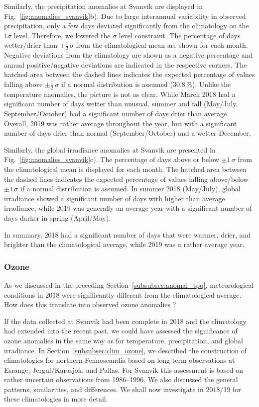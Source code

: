 \documentclass[bg, manuscript]{copernicus}
\begin{document}
Similarly, the precipitation anomalies at Svanvik are displayed in Fig.~\ref{fig:anomalies_svanvik}b). Due to large interannual variability in observed precipitation, only a few days deviated significantly from the climatology on the $1 \sigma$ level. Therefore, we lowered the $\sigma$ level constraint. The percentage of days wetter/drier than $\pm \frac{1}{2}\,\sigma$ from the climatological mean are shown for each month. Negative deviations from the climatology are shown as a negative percentage and annual positive/negative deviations are indicated in the respective corners. The hatched area between the dashed lines indicates the expected percentage of values falling above $\pm\frac{1}{2}\,\sigma$ if a normal distribution is assumed ($30.8\,\unit{\%}$). Unlike the temperature anomalies, the picture is not as clear. While March 2018 had a significant number of days wetter than unusual, summer and fall (May/July, September/October) had a significant number of days drier than average. Overall, 2019 was rather average throughout the year, but with a significant number of days drier than normal (September/October) and a wetter December.

Similarly, the global irradiance anomalies at Svanvik are presented in Fig.~\ref{fig:anomalies_svanvik}c). The percentage of days above or below $\pm 1\,\sigma$ from the climatological mean is displayed for each month. The hatched area between the dashed lines indicates the expected percentage of values falling above/below $\pm 1\,\sigma$ if a normal distribution is assumed. In summer 2018 (May/July), global irradiance showed a significant number of days with higher than average irradiance, while 2019 was generally an average year with a significant number of days darker in spring (April/May).

In summary, 2018 had a significant number of days that were warmer, drier, and brighter than the climatological average, while 2019 was a rather average year.

\subsubsection{Ozone}
\label{subsubsec:anomal_ozone}
As we discussed in the preceding Section~\ref{subsubsec:anomal_tpq}, meteorological conditions in 2018 were significantly different from the climatological average. How does this translate into observed ozone anomalies \chem{\Delta[O_3]}?

If the data collected at Svanvik had been complete in 2018 and the climatology had extended into the recent past, we could have assessed the significance of ozone anomalies in the same way as for temperature, precipitation, and global irradiance. In Section~\ref{subsubsec:clim_ozone}, we described the construction of climatologies for northern Fennoscandia based on long-term observations at Esrange, Jergul/Karasjok, and Pallas. For Svanvik this assessment is based on rather uncertain observations from 1986--1996. We also discussed the general patterns, similarities, and differences. We shall now investigate \chem{\Delta[O_3]} in 2018/19 for these climatologies in more detail.
\end{document}
